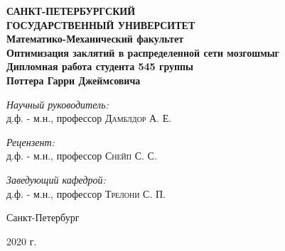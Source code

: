 \documentclass[aps,%
12pt,%
final,%
oneside,
onecolumn,%
musixtex, %
superscriptaddress,%
centertags]{article} %
\begin{document}
\begin{titlepage}
\begin{center}
\textbf{\Large САНКТ-ПЕТЕРБУРГСКИЙ \\ ГОСУДАРСТВЕННЫЙ УНИВЕРСИТЕТ} \\[1.0cm]
\textbf{\large Математико-Механический факультет} \\[0.2cm]

\textbf{\LARGE Оптимизация заклятий в распределенной сети мозгошмыг}\\[1.0cm]
\textbf{\Large Дипломная работа студента 545 группы} \\[0.2cm]
\textbf{\Large Поттера Гарри Джеймсовича} \\[3.5cm]

\begin{flushright} \large
\emph{Научный руководитель:} \\
д.ф. - м.н., профессор \textsc{Дамблдор А. Е.}
\end{flushright}
 \begin{flushright} \large
\emph{Рецензент:} \\
д.ф. - м.н., профессор \textsc{Снейп С. С.}
\end{flushright}
\begin{flushright} \large
\emph{Заведующий кафедрой:} \\
д.ф. - м.н., профессор \textsc{Трелони С. П.}
\end{flushright}
\vfill

{\large {Санкт-Петербург}} \par
{\large {2020 г.}}
\end{center}
\end{titlepage}

\tableofcontents
\end{document}
